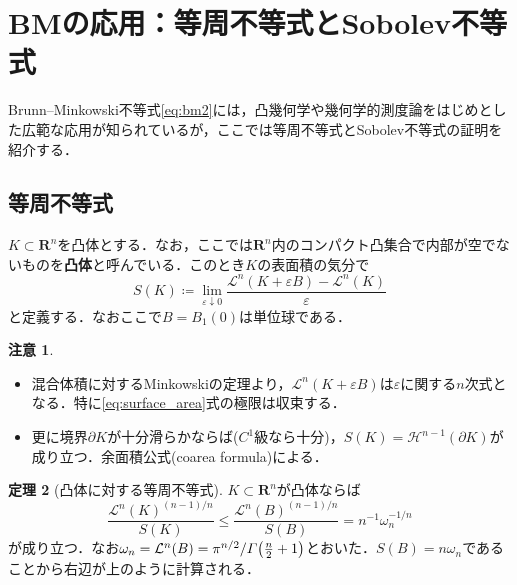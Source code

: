 \documentclass[a4j]{ltjsarticle}
\newcommand{\Rset}{\mathbf{R}}
\newcommand{\Lm}{\mathcal{L}}
\newcommand{\Hm}{\mathcal{H}}
\newcommand{\1}{\bm{1}}
\numberwithin{equation}{section}
\theoremstyle{definition}
\newtheorem{thm}{定理}[section]
\newtheorem{rmk}[thm]{注意}
\begin{document}
\section{BMの応用：等周不等式とSobolev不等式}
Brunn--Minkowski不等式\eqref{eq:bm2}には，凸幾何学や幾何学的測度論をはじめとした広範な応用が知られているが，ここでは等周不等式とSobolev不等式の証明を紹介する．
\subsection{等周不等式}
$K\subset\Rset^n$を凸体とする．なお，ここでは$\Rset^n$内のコンパクト凸集合で内部が空でないものを\textbf{凸体}と呼んでいる．このとき$K$の表面積の気分で
\begin{equation}
    S(K)\coloneqq \lim_{\varepsilon\downarrow 0}\frac{\Lm^n(K+\varepsilon B)-\Lm^n(K)}{\varepsilon} \label{eq:surface_area}
\end{equation}
と定義する．なおここで$B=B_{1}(0)$は単位球である．
\begin{rmk}
    \begin{itemize}
        \item 混合体積に対するMinkowskiの定理より，$\Lm^n(K+\varepsilon B)$は$\varepsilon$に関する$n$次式となる．特に\eqref{eq:surface_area}式の極限は収束する．
        \item 更に境界$\partial K$が十分滑らかならば($C^1$級なら十分)，$S(K)=\Hm^{n-1}(\partial K)$が成り立つ．余面積公式(coarea formula)による．
    \end{itemize}
\end{rmk}
\begin{thm}[凸体に対する等周不等式]
    $K\subset\Rset^n$が凸体ならば
    \begin{equation}
        \frac{\Lm^n(K)^{(n-1)/n}}{S(K)}\leq \frac{\Lm^n(B)^{(n-1)/n}}{S(B)}=n^{-1}\omega_n^{-1/n}\label{eq:isop_ineq_conv}\tag{IP1}
    \end{equation}
    が成り立つ．なお$\omega_n=\Lm^n(B)=\pi^{n/2}/\varGamma\qty(\frac{n}{2}+1)$とおいた．$S(B)=n\omega_n$であることから右辺が上のように計算される．
\end{thm}
\end{document}
